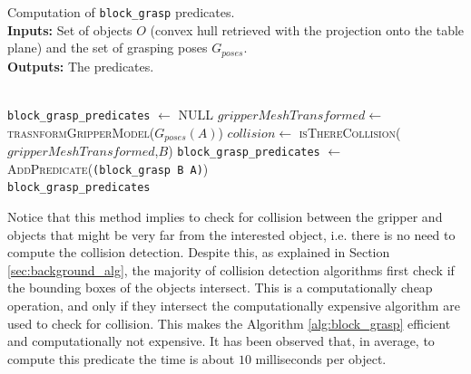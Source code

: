 \begin{algorithm}
\caption{Computation of \texttt{block\_grasp} predicates. \\
\textbf{Inputs:} Set of objects $O$ (convex hull retrieved with the projection onto the table plane) and  the set of grasping poses $G_{poses}$.\\
\textbf{Outputs:} The  predicates.
}\label{alg:block_grasp}
\begin{algorithmic}
\\
  \texttt{block\_grasp\_predicates} $\gets$ \textsc{NULL}
  \State $gripperMeshTransformed \gets$ \textsc{trasnformGripperModel}($G_{poses}(A)$)
	\State $collision \gets$ \textsc{isThereCollision($gripperMeshTransformed$,$B$)}
		\State \texttt{block\_grasp\_predicates} $\gets$ \textsc{AddPredicate}(\texttt{(block\_grasp B A)})
	\EndIf
  \EndIf
\EndFor
\EndFor \\
\Return  \texttt{block\_grasp\_predicates}
\EndFunction
\end{algorithmic}
\end{algorithm}   
 
Notice that this method implies to check for collision between the gripper and objects that might be very far from the interested object, i.e. there is no need to compute the collision detection.  Despite this, as explained in Section \ref{sec:background_alg}, the majority of collision detection algorithms first check if the bounding boxes of the objects intersect. This is a computationally cheap operation, and only if they intersect the computationally expensive algorithm are used to check for collision. This makes the Algorithm \ref{alg:block_grasp} efficient and computationally not expensive. It has been observed that, in average, to compute this predicate the time is about $10$ milliseconds per object. 
 

